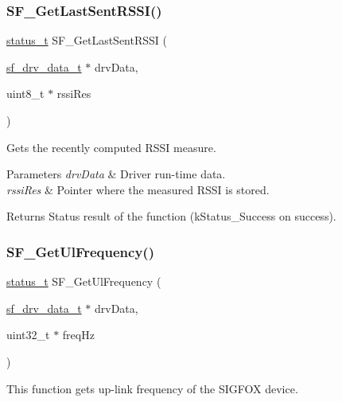 \subsubsection{\texorpdfstring{SF\_GetLastSentRSSI()}{SF\_GetLastSentRSSI()}}
{\footnotesize\ttfamily \mbox{\hyperlink{group__ksdk__common_gaaabdaf7ee58ca7269bd4bf24efcde092}{status\+\_\+t}} S\+F\+\_\+\+Get\+Last\+Sent\+R\+S\+SI (\begin{DoxyParamCaption}\item[{\mbox{\hyperlink{structsf__drv__data__t}{sf\+\_\+drv\+\_\+data\+\_\+t}} $\ast$}]{drv\+Data,  }\item[{uint8\+\_\+t $\ast$}]{rssi\+Res }\end{DoxyParamCaption})}



Gets the recently computed R\+S\+SI measure. 


\begin{DoxyParams}{Parameters}
{\em drv\+Data} & Driver run-\/time data. \\
\hline
{\em rssi\+Res} & Pointer where the measured R\+S\+SI is stored.\\
\hline
\end{DoxyParams}
\begin{DoxyReturn}{Returns}
Status result of the function (k\+Status\+\_\+\+Success on success). 
\end{DoxyReturn}
\mbox{\label{group__sf__functions__group_ga6652c5c69ff2e8687e5575ea84229c21}} 
\subsubsection{\texorpdfstring{SF\_GetUlFrequency()}{SF\_GetUlFrequency()}}
{\footnotesize\ttfamily \mbox{\hyperlink{group__ksdk__common_gaaabdaf7ee58ca7269bd4bf24efcde092}{status\+\_\+t}} S\+F\+\_\+\+Get\+Ul\+Frequency (\begin{DoxyParamCaption}\item[{\mbox{\hyperlink{structsf__drv__data__t}{sf\+\_\+drv\+\_\+data\+\_\+t}} $\ast$}]{drv\+Data,  }\item[{uint32\+\_\+t $\ast$}]{freq\+Hz }\end{DoxyParamCaption})}



This function gets up-\/link frequency of the S\+I\+G\+F\+OX device. 


